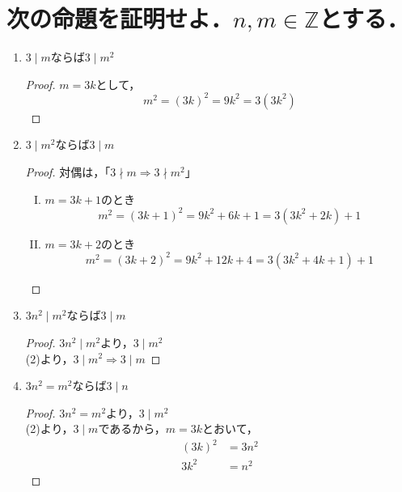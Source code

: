 \documentclass[a4paper,12pt]{ltjsarticle}
\newcommand{\Z}{\mathbb{Z}}
\begin{document}
\section{次の命題を証明せよ．$n,m \in \Z$とする．}
\begin{enumerate}[(1)]
    \item $3 \mid m$ならば$3 \mid m^2$
        \begin{proof}
            $m = 3k$として，
            \begin{equation*}
                m^2 = (3k)^2 = 9k^2 = 3(3k^2)
            \end{equation*}
        \end{proof}
    \item $3 \mid m^2$ならば$3 \mid m$
        \begin{proof}
            対偶は，「$3 \nmid m \Rightarrow 3 \nmid m^2$」 \\
            \begin{enumerate}[(I)]
                \item $m = 3k + 1$のとき
                    \begin{equation*}
                        m^2 = (3k + 1)^2 = 9k^2 + 6k + 1 = 3(3k^2 + 2k) + 1
                    \end{equation*}
                \item $m = 3k + 2$のとき
                    \begin{equation*}
                        m^2 = (3k + 2)^2 = 9k^2 + 12k + 4 = 3(3k^2 + 4k + 1) + 1
                    \end{equation*}
            \end{enumerate}
        \end{proof}
    \item $3n^2 \mid m^2$ならば$3 \mid m$
        \begin{proof}
            $3n^2 \mid m^2$より，$3 \mid m^2$ \\
            (2)より，$3 \mid m^2 \Rightarrow 3 \mid m$
        \end{proof}
    \item $3n^2 = m^2$ならば$3 \mid n$
        \begin{proof}
            $3n^2 = m^2$より，$3 \mid m^2$ \\
            (2)より，$3 \mid m$であるから，$m = 3k$とおいて，
            \begin{align*}
                (3k)^2 &= 3n^2 \\
                3k^2 &= n^2
            \end{align*}

\end{proof}
\end{enumerate}
\end{document}
